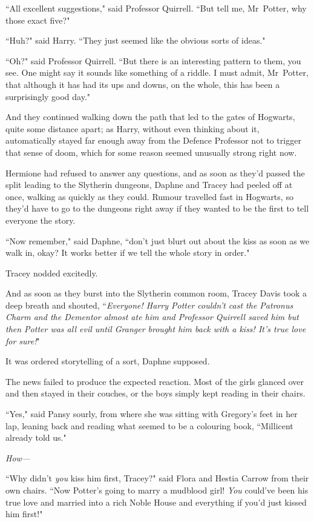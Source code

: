 ``All excellent suggestions," said Professor Quirrell. ``But tell me, Mr~Potter, why those exact five?"

``Huh?" said Harry. ``They just seemed like the obvious sorts of ideas."

``Oh?" said Professor Quirrell. ``But there is an interesting pattern to them, you see. One might say it sounds like something of a riddle. I must admit, Mr~Potter, that although it has had its ups and downs, on the whole, this has been a surprisingly good day."

And they continued walking down the path that led to the gates of Hogwarts, quite some distance apart; as Harry, without even thinking about it, automatically stayed far enough away from the Defence Professor not to trigger that sense of doom, which for some reason seemed unusually strong right now.


Hermione had refused to answer any questions, and as soon as they'd passed the split leading to the Slytherin dungeons, Daphne and Tracey had peeled off at once, walking as quickly as they could. Rumour travelled fast in Hogwarts, so they'd have to go to the dungeons right away if they wanted to be the first to tell everyone the story.

``Now remember," said Daphne, ``don't just blurt out about the kiss as soon as we walk in, okay? It works better if we tell the whole story in order."

Tracey nodded excitedly.

And as soon as they burst into the Slytherin common room, Tracey Davis took a deep breath and shouted, ``\emph{Everyone! Harry Potter couldn't cast the Patronus Charm and the Dementor almost ate him and Professor Quirrell saved him but then Potter was all evil until Granger brought him back with a kiss! It's true love for sure!}"

It was ordered storytelling of a sort, Daphne supposed.

The news failed to produce the expected reaction. Most of the girls glanced over and then stayed in their couches, or the boys simply kept reading in their chairs.

``Yes," said Pansy sourly, from where she was sitting with Gregory's feet in her lap, leaning back and reading what seemed to be a colouring book, ``Millicent already told us."

\emph{How—}

``Why didn't \emph{you} kiss him first, Tracey?" said Flora and Hestia Carrow from their own chairs. ``Now Potter's going to marry a mudblood girl! \emph{You} could've been his true love and married into a rich Noble House and everything if you'd just kissed him first!"

